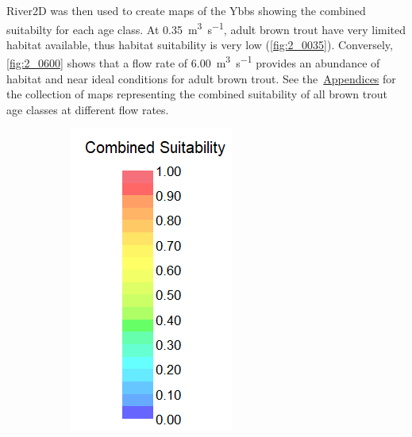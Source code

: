 River2D was then used to create maps of the Ybbs showing the combined suitabilty for each age class. At \SI[per-mode=symbol]{0.35}{\cubic\meter\per\second}, adult brown trout have very limited habitat available, thus habitat suitability is very low (\cref{fig:2_0035}). Conversely, \cref{fig:2_0600} shows that a flow rate of \SI[per-mode=symbol]{6.00}{\cubic\meter\per\second} provides an abundance of habitat and near ideal conditions for adult brown trout. See the~\hyperref[appendixA]{Appendices} for the collection of maps representing the combined suitability of all brown trout age classes at different flow rates. 


\begin{figure}[!htb] 
	\centering
	\begin{subfigure}{.3\textwidth}
		\centering
		\includegraphics[width=.9\linewidth]{images/suitability_index}

\end{subfigure}
\end{figure}
